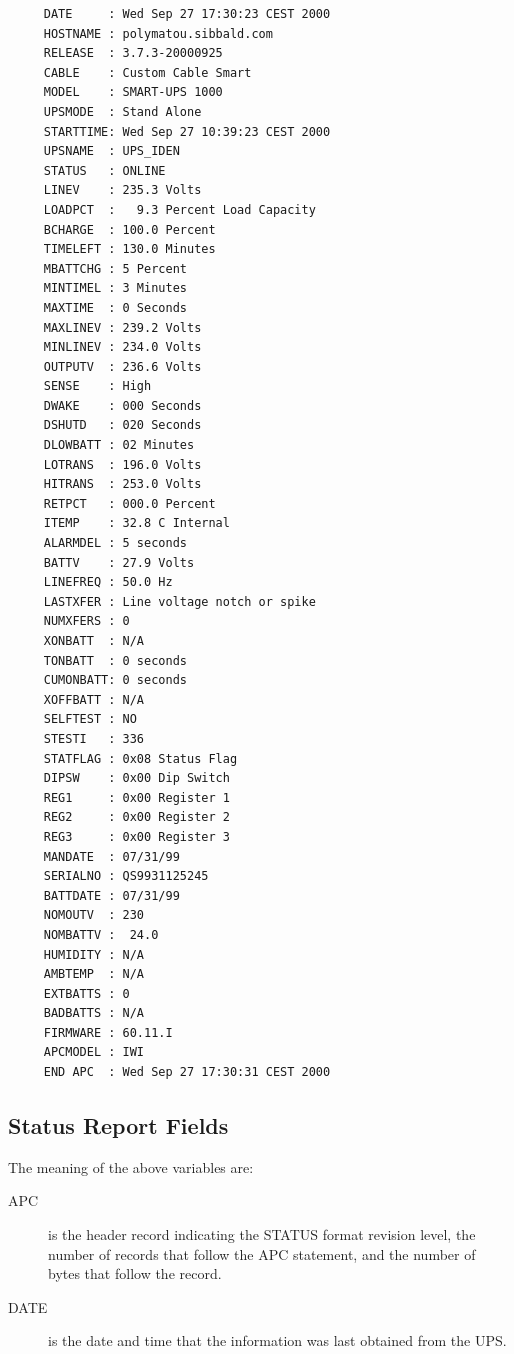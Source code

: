 {{{{{{{{{{{{{{{\begin{verbatim}
     DATE     : Wed Sep 27 17:30:23 CEST 2000
     HOSTNAME : polymatou.sibbald.com
     RELEASE  : 3.7.3-20000925
     CABLE    : Custom Cable Smart
     MODEL    : SMART-UPS 1000
     UPSMODE  : Stand Alone
     STARTTIME: Wed Sep 27 10:39:23 CEST 2000
     UPSNAME  : UPS_IDEN
     STATUS   : ONLINE
     LINEV    : 235.3 Volts
     LOADPCT  :   9.3 Percent Load Capacity
     BCHARGE  : 100.0 Percent
     TIMELEFT : 130.0 Minutes
     MBATTCHG : 5 Percent
     MINTIMEL : 3 Minutes
     MAXTIME  : 0 Seconds
     MAXLINEV : 239.2 Volts
     MINLINEV : 234.0 Volts
     OUTPUTV  : 236.6 Volts
     SENSE    : High
     DWAKE    : 000 Seconds
     DSHUTD   : 020 Seconds
     DLOWBATT : 02 Minutes
     LOTRANS  : 196.0 Volts
     HITRANS  : 253.0 Volts
     RETPCT   : 000.0 Percent
     ITEMP    : 32.8 C Internal
     ALARMDEL : 5 seconds
     BATTV    : 27.9 Volts
     LINEFREQ : 50.0 Hz
     LASTXFER : Line voltage notch or spike
     NUMXFERS : 0
     XONBATT  : N/A
     TONBATT  : 0 seconds
     CUMONBATT: 0 seconds
     XOFFBATT : N/A
     SELFTEST : NO
     STESTI   : 336
     STATFLAG : 0x08 Status Flag
     DIPSW    : 0x00 Dip Switch
     REG1     : 0x00 Register 1
     REG2     : 0x00 Register 2
     REG3     : 0x00 Register 3
     MANDATE  : 07/31/99
     SERIALNO : QS9931125245
     BATTDATE : 07/31/99
     NOMOUTV  : 230
     NOMBATTV :  24.0
     HUMIDITY : N/A
     AMBTEMP  : N/A
     EXTBATTS : 0
     BADBATTS : N/A
     FIRMWARE : 60.11.I
     APCMODEL : IWI
     END APC  : Wed Sep 27 17:30:31 CEST 2000
\end{verbatim}
\normalsize

\label{Status-Report-Fields}

\subsection*{Status Report Fields}

\label{index-Status-256}
The meaning of the above variables are:  

\begin{description}

\item [APC]
   is the header record indicating the STATUS format revision level, the number
of records that follow the APC statement, and the number of bytes that follow
the record.  

\item [DATE]
   is the date and time that the information was last obtained from the UPS.  


\end{description}}}}}}}}}}}}}}}}
